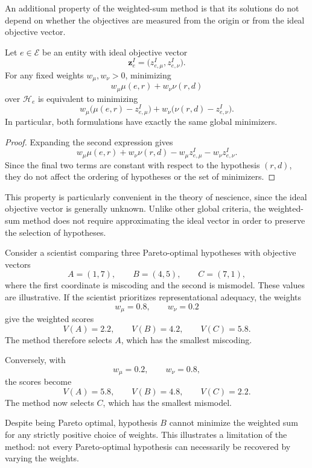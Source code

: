 An additional property of the weighted-sum method is that its solutions do not depend on whether the objectives are measured from the origin or from the ideal objective vector.

\begin{proposition}
Let $e\in\mathcal E$ be an entity with ideal objective vector
\[
\mathbf z_e^I = \bigl(z_{e,\mu}^I,z_{e,\nu}^I\bigr).
\]
For any fixed weights $w_\mu,w_\nu>0$, minimizing
\[
w_\mu\mu(e,r)+w_\nu\nu(r,d)
\]
over $\mathcal H_e$ is equivalent to minimizing
\[
w_\mu\bigl(\mu(e,r)-z_{e,\mu}^I\bigr) + w_\nu\bigl(\nu(r,d)-z_{e,\nu}^I\bigr).
\]
In particular, both formulations have exactly the same global minimizers.
\end{proposition}
\begin{proof}
Expanding the second expression gives
\[
w_\mu\mu(e,r)+w_\nu\nu(r,d) - w_\mu z_{e,\mu}^I - w_\nu z_{e,\nu}^I.
\]
Since the final two terms are constant with respect to the hypothesis $(r,d)$, they do not affect the ordering of hypotheses or the set of minimizers.
\end{proof}

This property is particularly convenient in the theory of nescience, since the ideal objective vector is generally unknown. Unlike other global criteria, the weighted-sum method does not require approximating the ideal vector in order to preserve the selection of hypotheses.

\begin{example}
Consider a scientist comparing three Pareto-optimal hypotheses with objective vectors
\[
A=(1,7),\qquad B=(4,5),\qquad C=(7,1),
\]
where the first coordinate is miscoding and the second is mismodel. These values are illustrative. If the scientist prioritizes representational adequacy, the weights
\[
w_\mu=0.8,\qquad w_\nu=0.2
\]
give the weighted scores
\[
V(A)=2.2,\qquad V(B)=4.2,\qquad V(C)=5.8.
\]
The method therefore selects $A$, which has the smallest miscoding.

Conversely, with
\[
w_\mu=0.2,\qquad w_\nu=0.8,
\]
the scores become
\[
V(A)=5.8,\qquad V(B)=4.8,\qquad V(C)=2.2.
\]
The method now selects $C$, which has the smallest mismodel.

Despite being Pareto optimal, hypothesis $B$ cannot minimize the weighted sum for any strictly positive choice of weights. This illustrates a limitation of the method: not every Pareto-optimal hypothesis can necessarily be recovered by varying the weights.
\end{example}

